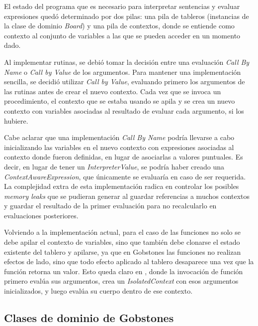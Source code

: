 El estado del programa que es necesario para interpretar sentencias y evaluar expresiones quedó determinado por dos pilas: una pila de tableros (instancias de la clase de dominio \textit{Board}) y una pila de contextos, donde se entiende como contexto al conjunto de variables a las que se pueden acceder en un momento dado.

Al implementar rutinas, se debió tomar la decisión entre una evaluación \textit{Call By Name} o \textit{Call by Value}\cite{DowekL11} de los argumentos. Para mantener una implementación sencilla, se decidió utilizar \textit{Call by Value}, evaluando primero los argumentos de las rutinas antes de crear el nuevo contexto. 
Cada vez que se invoca un procedimiento, el contexto que se estaba usando se apila y se crea un nuevo contexto con variables asociadas al resultado de evaluar cada argumento, si los hubiere. 

Cabe aclarar que una implementación \textit{Call By Name} podría llevarse a cabo inicializando las variables en el nuevo contexto con expresiones asociadas al contexto donde fueron definidas, en lugar de asociarlas a valores puntuales. Es decir, en lugar de tener un \textit{InterpreterValue}, se podría haber creado una \textit{ContextAwareExpression}, que únicamente se evaluaría en caso de ser requerida. La complejidad extra de esta implementación radica en controlar los posibles \textit{memory leaks} que se pudieran generar al guardar referencias a muchos contextos y guardar el resultado de la primer evaluación para no recalcularlo en evaluaciones posteriores.

Volviendo a la implementación actual, para el caso de las funciones no solo se debe apilar el contexto de variables, sino que también debe clonarse el estado existente del tablero y apilarse, ya que en Gobstones las funciones no realizan efectos de lado, sino que todo efecto aplicado al tablero desaparece una vez que la función retorna un valor. Esto queda claro en , donde la invocación de función primero evalúa sus argumentos, crea un \textit{IsolatedContext} con esos argumentos inicializados, y luego evalúa su cuerpo dentro de ese contexto.


\subsection{Clases de dominio de Gobstones}

